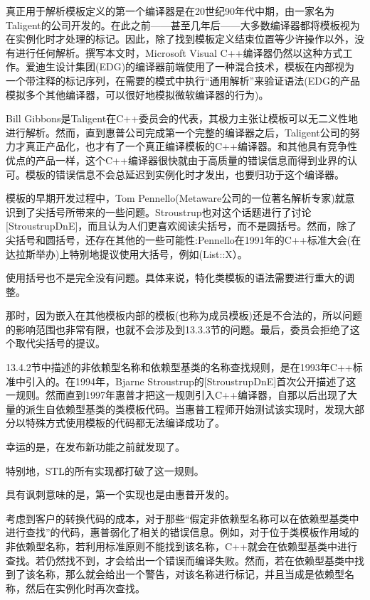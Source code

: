 真正用于解析模板定义的第一个编译器是在20世纪90年代中期，由一家名为Taligent的公司开发的。在此之前——甚至几年后——大多数编译器都将模板视为在实例化时才处理的标记。因此，除了找到模板定义结束位置等少许操作以外，没有进行任何解析。撰写本文时，Microsoft Visual C++编译器仍然以这种方式工作。爱迪生设计集团(EDG)的编译器前端使用了一种混合技术，模板在内部视为一个带注释的标记序列，在需要的模式中执行“通用解析”来验证语法(EDG的产品模拟多个其他编译器，可以很好地模拟微软编译器的行为)。

Bill Gibbons是Taligent在C++委员会的代表，其极力主张让模板可以无二义性地进行解析。然而，直到惠普公司完成第一个完整的编译器之后，Taligent公司的努力才真正产品化，也才有了一个真正编译模板的C++编译器。和其他具有竞争性优点的产品一样，这个C++编译器很快就由于高质量的错误信息而得到业界的认可。模板的错误信息不会总延迟到实例化时才发出，也要归功于这个编译器。

模板的早期开发过程中，Tom Pennello(Metaware公司的一位著名解析专家)就意识到了尖括号所带来的一些问题。Stroustrup也对这个话题进行了讨论[StroustrupDnE]，而且认为人们更喜欢阅读尖括号，而不是圆括号。然而，除了尖括号和圆括号，还存在其他的一些可能性:Pennello在1991年的C++标准大会(在达拉斯举办)上特别地提议使用大括号，例如(List{::X}）。

\begin{notice}使用括号也不是完全没有问题。具体来说，特化类模板的语法需要进行重大的调整。
\end{notice}

那时，因为嵌入在其他模板内部的模板(也称为成员模板)还是不合法的，所以问题的影响范围也非常有限，也就不会涉及到13.3.3节的问题。最后，委员会拒绝了这个取代尖括号的提议。

13.4.2节中描述的非依赖型名称和依赖型基类的名称查找规则，是在1993年C++标准中引入的。在1994年，Bjarne Stroustrup的[StroustrupDnE]首次公开描述了这一规则。然而直到1997年惠普才把这一规则引入C++编译器，自那以后出现了大量的派生自依赖型基类的类模板代码。当惠普工程师开始测试该实现时，发现大部分以特殊方式使用模板的代码都无法编译成功了。

\begin{notice}幸运的是，在发布新功能之前就发现了。
\end{notice}

特别地，STL的所有实现都打破了这一规则。

\begin{notice}具有讽刺意味的是，第一个实现也是由惠普开发的。
\end{notice}

考虑到客户的转换代码的成本，对于那些“假定非依赖型名称可以在依赖型基类中进行查找”的代码，惠普弱化了相关的错误信息。例如，对于位于类模板作用域的非依赖型名称，若利用标准原则不能找到该名称，C++就会在依赖型基类中进行查找。若仍然找不到，才会给出一个错误而编译失败。然而，若在依赖型基类中找到了该名称，那么就会给出一个警告，对该名称进行标记，并且当成是依赖型名称，然后在实例化时再次查找。

